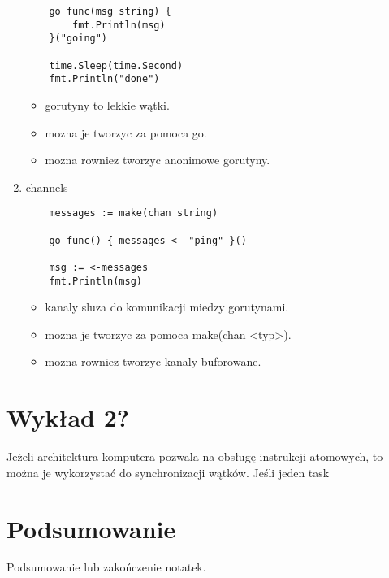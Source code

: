 \documentclass[11pt,a4paper]{article}
\begin{document}
\begin{enumerate}
\begin{verbatim}
    go func(msg string) {
        fmt.Println(msg)
    }("going")

    time.Sleep(time.Second)
    fmt.Println("done")
    \end{verbatim}
    \begin{itemize}
        \item gorutyny to lekkie wątki.
        \item mozna je tworzyc za pomoca go.
        \item mozna rowniez tworzyc anonimowe gorutyny.
    \end{itemize}
\item channels \begin{verbatim}
    messages := make(chan string)

    go func() { messages <- "ping" }()

    msg := <-messages
    fmt.Println(msg)
    \end{verbatim}
    \begin{itemize}
        \item kanaly sluza do komunikacji miedzy gorutynami.
        \item mozna je tworzyc za pomoca make(chan <typ>).
        \item mozna rowniez tworzyc kanaly buforowane.
    \end{itemize}
\end{enumerate}

\section{Wykład 2?}
Jeżeli architektura komputera pozwala na obsługę instrukcji atomowych, to można je wykorzystać do synchronizacji wątków. Jeśli jeden task




\section{Podsumowanie}
Podsumowanie lub zakończenie notatek.
\end{document}
